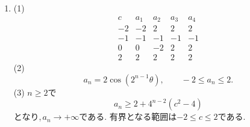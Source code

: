 \begin{enumerate}[label=\textbf{問\arabic*.},leftmargin=3.8em,format=\bookitemlink{practice-special}{answer}{problem}]
          \item (1)
                \[
                  \begin{array}{c|rrrr}
                    c&a_1&a_2&a_3&a_4\\ \hline
                    -2&-2&2&2&2\\
                    -1&-1&-1&-1&-1\\
                     0&0&-2&2&2\\
                     2&2&2&2&2
                  \end{array}
                \]
                (2)
                \[
                  a_n=2\cos(2^{n-1}\theta),\qquad -2\le a_n\le2.
                \]
                (3) $\displaystyle n\ge2$で
                \[
                  a_n\ge2+4^{n-2}(c^2-4)
                \]
                となり,\,$\displaystyle a_n\to+\infty$である.
                有界となる範囲は$\displaystyle -2\le c\le2$である.
        \end{enumerate}

